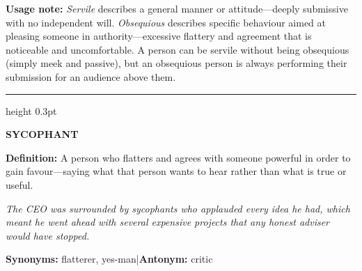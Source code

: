 \documentclass[11pt, a4paper]{article}
\newcommand{\wordentry}[2]{%
  \vspace{0.9em}%
  {\large\bfseries #1}%
  \quad{\itshape\color{posgray}(#2)}%
  \par\vspace{0.15em}%
}
\newcommand{\definition}[1]{%
  \textbf{Definition:} #1\par%
}
\newcommand{\examplesentence}[1]{%
  \begin{mdframed}[
    backgroundcolor=exampletan,
    linewidth=0pt,
    innerleftmargin=8pt,
    innerrightmargin=8pt,
    innertopmargin=5pt,
    innerbottommargin=5pt,
    skipabove=3pt,
    skipbelow=3pt
  ]
  \small\itshape #1
  \end{mdframed}%
}
\newcommand{\synantline}[2]{%
  \vspace{0.2em}%
  \textbf{Synonyms:} #1\quad|\quad\textbf{Antonym:} #2\par%
}
\newcommand{\usagenote}[1]{%
  \begin{mdframed}[
    backgroundcolor=notebg,
    linecolor=noteborder,
    linewidth=1pt,
    innerleftmargin=8pt,
    innerrightmargin=8pt,
    innertopmargin=5pt,
    innerbottommargin=5pt,
    skipabove=4pt,
    skipbelow=4pt
  ]
  \small\textbf{Usage note:} #1
  \end{mdframed}%
}
\newcommand{\entryrule}{%
  \vspace{0.3em}%
  {\color{posgray}\hrule height 0.3pt}%
  \vspace{0.3em}%
}
\begin{document}
\usagenote{\textit{Servile} describes a general manner or attitude---deeply submissive with no independent will. \textit{Obsequious} describes specific behaviour aimed at pleasing someone in authority---excessive flattery and agreement that is noticeable and uncomfortable. A person can be servile without being obsequious (simply meek and passive), but an obsequious person is always performing their submission for an audience above them.}
\entryrule

\wordentry{SYCOPHANT}{noun}
\definition{A person who flatters and agrees with someone powerful in order to gain favour---saying what that person wants to hear rather than what is true or useful.}
\examplesentence{The CEO was surrounded by sycophants who applauded every idea he had, which meant he went ahead with several expensive projects that any honest adviser would have stopped.}
\synantline{flatterer, yes-man}{critic}

\newpage
\end{document}
